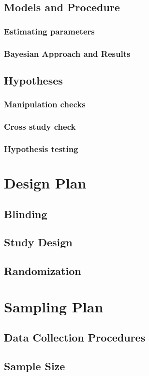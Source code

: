 \documentclass{article}
\begin{document}
    \subsection{Models and Procedure}
    \subsubsection{Estimating parameters}
    \subsubsection{Bayesian Approach and Results}
    \subsection{Hypotheses}
    \subsubsection{Manipulation checks}
    \subsubsection{Cross study check}
    \subsubsection{Hypothesis testing}

    \section{Design Plan}
    \subsection{Blinding}
    \subsection{Study Design}
    \subsection{Randomization}
    \section{Sampling Plan}
    \subsection{Data Collection Procedures}
    \subsection{Sample Size}
\end{document}
